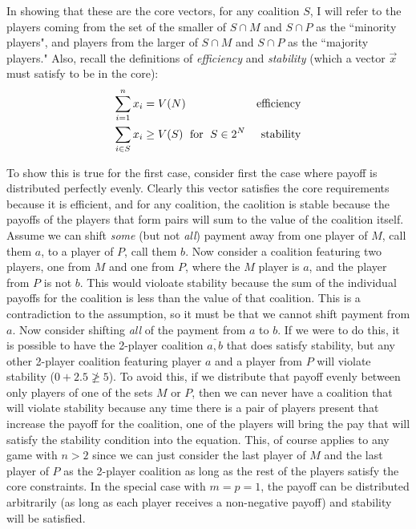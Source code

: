\documentclass{article}
\begin{document}
\begin{enumerate}
\begin{enumerate}
    In showing that these are the core vectors, for any coalition $S$, I will refer to the players coming from the set of the smaller of $S \cap M$ and $S \cap P$ as the ``minority players", and players from the larger of $S \cap M$ and $S \cap P$ as the ``majority players." Also, recall the definitions of \emph{efficiency} and \emph{stability} (which a vector $\vec{x}$ must satisfy to be in the core):
    \begin{align}
    \sum^{n}_{i = 1}{x_{i}}  &=    V(N)                                &  \text{efficiency}\\
    \sum_{i \in S}{x_{i}}    &\ge  V(S) \text{\; for \;} S \in 2^{N}   &  \text{stability}
    \end{align}

    To show this is true for the first case, consider first the case where payoff is distributed perfectly evenly. Clearly this vector satisfies the core requirements because it is efficient, and for any coalition, the caolition is stable because the payoffs of the players that form pairs will sum to the value of the coalition itself. Assume we can shift \emph{some} (but not \emph{all}) payment away from one player of $M$, call them $a$, to a player of $P$, call them $b$. Now consider a coalition featuring two players, one from $M$ and one from $P$, where the $M$ player is $a$, and the player from $P$ is not $b$. This would violoate stability because the sum of the individual payoffs for the coalition is less than the value of that coalition. This is a contradiction to the assumption, so it must be that we cannot shift payment from $a$. Now consider shifting \emph{all} of the payment from $a$ to $b$. If we were to do this, it is possible to have the 2-player coalition $\overline{a, b}$ that does satisfy stability, but any other 2-player coalition featuring player $a$ and a player from $P$ will violate stability ($0 + 2.5 \not\ge 5$). To avoid this, if we distribute that payoff evenly between only players of one of the sets $M$ or $P$, then we can never have a coalition that will violate stability because any time there is a pair of players present that increase the payoff for the coalition, one of the players will bring the pay that will satisfy the stability condition into the equation. This, of course applies to any game with $n > 2$ since we can just consider the last player of $M$ and the last player of $P$ as the 2-player coalition as long as the rest of the players satisfy the core constraints. In the special case with $m = p = 1$, the payoff can be distributed arbitrarily (as long as each player receives a non-negative payoff) and stability will be satisfied. \\


\end{enumerate}
\end{enumerate}
\end{document}
